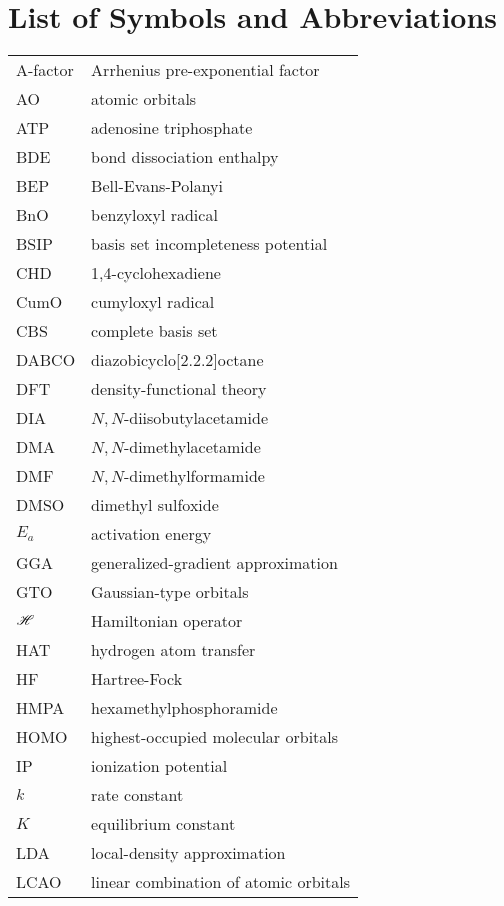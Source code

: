 
\label{listofabb}

\chapter{List of Symbols and Abbreviations}
\begin{longtable}{m{3cm} l}
  A-factor & Arrhenius pre-exponential factor \\
  AO & atomic orbitals \\
  ATP & adenosine triphosphate \\
  BDE & bond dissociation enthalpy \\
  BEP & Bell-Evans-Polanyi \\
  BnO & benzyloxyl radical \\
  BSIP & basis set incompleteness potential \\
  CHD & 1,4-cyclohexadiene \\
  CumO & cumyloxyl radical \\
  CBS & complete basis set \\
  DABCO & diazobicyclo[2.2.2]octane \\
  DFT & density-functional theory \\
  DIA & $N,N$-diisobutylacetamide \\
  DMA & $N,N$-dimethylacetamide \\
  DMF & $N,N$-dimethylformamide \\
  DMSO & dimethyl sulfoxide \\
  $E_a$ & activation energy \\
  GGA & generalized-gradient approximation \\
  GTO & Gaussian-type orbitals \\
  $\mathscr{H}$ & Hamiltonian operator \\
  HAT & hydrogen atom transfer \\
  HF & Hartree-Fock \\
  HMPA & hexamethylphosphoramide \\
  HOMO & highest-occupied molecular orbitals \\
  IP & ionization potential \\
  $k$ & rate constant \\
  $K$ & equilibrium constant \\
  LDA & local-density approximation \\
  LCAO & linear combination of atomic orbitals \\

\end{longtable}
